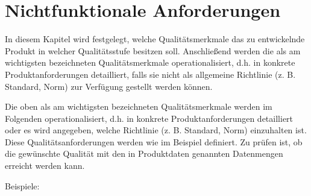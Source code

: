

\chapter{Nichtfunktionale Anforderungen}
\label{chap:non_functional_req}

In diesem Kapitel wird festgelegt, welche Qualitätsmerkmale das zu entwickelnde
Produkt in welcher Qualitätsstufe besitzen soll. Anschließend werden die als am
wichtigsten bezeichneten Qualitätsmerkmale operationalisiert, d.h. in konkrete
Produktanforderungen detailliert, falls sie nicht als allgemeine Richtlinie (z.
B. Standard, Norm) zur Verfügung gestellt werden können.


Die oben als am wichtigsten bezeichneten Qualitätsmerkmale werden im Folgenden
operationalisiert, d.h. in konkrete Produktanforderungen detailliert oder es
wird angegeben, welche Richtlinie (z. B. Standard, Norm) einzuhalten ist. Diese
Qualitätsanforderungen werden wie im Beispiel definiert. Zu prüfen ist, ob die
gewünschte Qualität mit den in Produktdaten genannten Datenmengen erreicht
werden kann.


Beispiele:

